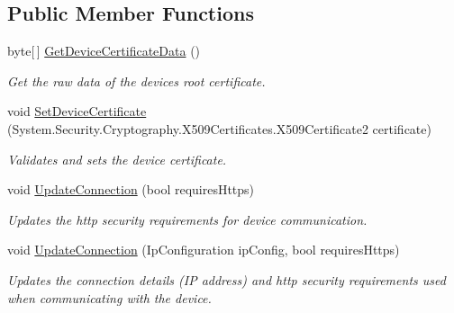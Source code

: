 \subsection*{Public Member Functions}
\begin{DoxyCompactItemize}
\item 
byte\mbox{[}$\,$\mbox{]} \hyperlink{interface_microsoft_1_1_tools_1_1_windows_device_portal_1_1_i_device_portal_connection_ad744c0610355739d44820f3bb1010f4e}{Get\+Device\+Certificate\+Data} ()
\begin{DoxyCompactList}\small\item\em Get the raw data of the device\textquotesingle{}s root certificate. \end{DoxyCompactList}\item 
void \hyperlink{interface_microsoft_1_1_tools_1_1_windows_device_portal_1_1_i_device_portal_connection_a0c4117efb8b63e25767f52e1a0252379}{Set\+Device\+Certificate} (System.\+Security.\+Cryptography.\+X509\+Certificates.\+X509\+Certificate2 certificate)
\begin{DoxyCompactList}\small\item\em Validates and sets the device certificate. \end{DoxyCompactList}\item 
void \hyperlink{interface_microsoft_1_1_tools_1_1_windows_device_portal_1_1_i_device_portal_connection_afcc3e9a50173560316bff9c1b0085769}{Update\+Connection} (bool requires\+Https)
\begin{DoxyCompactList}\small\item\em Updates the http security requirements for device communication. \end{DoxyCompactList}\item 
void \hyperlink{interface_microsoft_1_1_tools_1_1_windows_device_portal_1_1_i_device_portal_connection_a70508473f17f95abd516afc31a080b0d}{Update\+Connection} (Ip\+Configuration ip\+Config, bool requires\+Https)
\begin{DoxyCompactList}\small\item\em Updates the connection details (IP address) and http security requirements used when communicating with the device. \end{DoxyCompactList}\end{DoxyCompactItemize}
